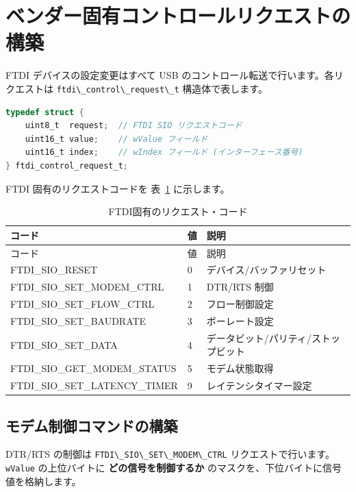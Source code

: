 \documentclass[10pt,twoside,openany,a4j]{ltjsbook}
\newcommand{\passthrough}[1]{#1}
\begin{document}
\section{ベンダー固有コントロールリクエストの構築}\label{ux30d9ux30f3ux30c0ux30fcux56faux6709ux30b3ux30f3ux30c8ux30edux30fcux30ebux30eaux30afux30a8ux30b9ux30c8ux306eux69cbux7bc9}

FTDI デバイスの設定変更はすべて USB
のコントロール転送で行います。各リクエストは
\passthrough{\lstinline!ftdi\_control\_request\_t!} 構造体で表します。

\begin{lstlisting}[language=C]
typedef struct {
    uint8_t  request;  // FTDI SIO リクエストコード
    uint16_t value;    // wValue フィールド
    uint16_t index;    // wIndex フィールド (インターフェース番号)
} ftdi_control_request_t;
\end{lstlisting}

FTDI 固有のリクエストコードを 表~\ref{tbl:ftdi_request_code}
に示します。

\begin{longtable}[]{@{}lll@{}}
\caption{\label{tbl:ftdi_request_code}FTDI固有のリクエスト・コード}\tabularnewline
\toprule\noalign{}
コード & 値 & 説明 \\
\midrule\noalign{}
\endfirsthead
\toprule\noalign{}
コード & 値 & 説明 \\
\midrule\noalign{}
\endhead
\bottomrule\noalign{}
\endlastfoot
FTDI\_SIO\_RESET & 0 & デバイス/バッファリセット \\
FTDI\_SIO\_SET\_MODEM\_CTRL & 1 & DTR/RTS 制御 \\
FTDI\_SIO\_SET\_FLOW\_CTRL & 2 & フロー制御設定 \\
FTDI\_SIO\_SET\_BAUDRATE & 3 & ボーレート設定 \\
FTDI\_SIO\_SET\_DATA & 4 & データビット/パリティ/ストップビット \\
FTDI\_SIO\_GET\_MODEM\_STATUS & 5 & モデム状態取得 \\
FTDI\_SIO\_SET\_LATENCY\_TIMER & 9 & レイテンシタイマー設定 \\
\end{longtable}

\subsection{モデム制御コマンドの構築}\label{ux30e2ux30c7ux30e0ux5236ux5fa1ux30b3ux30deux30f3ux30c9ux306eux69cbux7bc9}

DTR/RTS の制御は \passthrough{\lstinline!FTDI\_SIO\_SET\_MODEM\_CTRL!}
リクエストで行います。\passthrough{\lstinline!wValue!} の上位バイトに
\textbf{どの信号を制御するか}
のマスクを、下位バイトに信号値を格納します。
\end{document}
